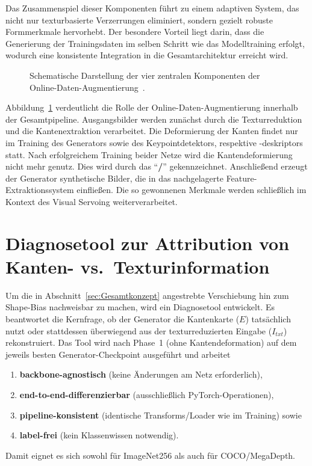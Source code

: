 Das Zusammenspiel dieser Komponenten führt zu einem adaptiven System, das nicht nur texturbasierte Verzerrungen eliminiert, sondern gezielt robuste Formmerkmale hervorhebt. Der besondere Vorteil liegt darin, dass die Generierung der Trainingsdaten im selben Schritt wie das Modelltraining erfolgt, wodurch eine konsistente Integration in die Gesamtarchitektur erreicht wird.

\begin{figure}[htpb]
    \centering
    
    \caption{Schematische Darstellung der vier zentralen Komponenten der Online-Daten-Augmentierung~\cite{He_2023_ICCV}.}
    \label{fig:PipelineGesamtkonzept}
\end{figure}
Abbildung~\ref{fig:PipelineGesamtkonzept} verdeutlicht die Rolle der Online-Daten-Augmentierung innerhalb der Gesamtpipeline. Ausgangsbilder werden zunächst durch die Texturreduktion und die Kantenextraktion verarbeitet. Die Deformierung der Kanten findet nur im Training des Generators sowie des Keypointdetektors, respektive -deskriptors statt. Nach erfolgreichem Training beider Netze wird die Kantendeformierung nicht mehr genutz. Dies wird durch das \enquote{\textbf{/}} gekennzeichnet. Anschließend erzeugt der Generator synthetische Bilder, die in das nachgelagerte Feature-Extraktionssystem einfließen. Die so gewonnenen Merkmale werden schließlich im Kontext des Visual Servoing weiterverarbeitet.




\section{Diagnosetool zur Attribution von Kanten- vs.\ Texturinformation}
\label{sec:DiagnoseTool}
Um die in Abschnitt~\ref{sec:Gesamtkonzept} angestrebte Verschiebung hin zum Shape-Bias nachweisbar zu machen, wird ein Diagnosetool entwickelt. Es beantwortet die Kernfrage, ob der Generator die Kantenkarte ($E$) tatsächlich nutzt oder stattdessen überwiegend aus der texturreduzierten Eingabe ($I_{txt}$) rekonstruiert.
Das Tool wird nach Phase~1 (ohne Kantendeformation) auf dem jeweils besten Generator-Checkpoint ausgeführt und arbeitet
\begin{enumerate}
    \item \textbf{backbone-agnostisch} (keine Änderungen am Netz erforderlich),
    \item \textbf{end-to-end-differenzierbar} (ausschließlich PyTorch-Operationen),
    \item \textbf{pipeline-konsistent} (identische Transforms/Loader wie im Training) sowie
    \item \textbf{label-frei} (kein Klassenwissen notwendig).
\end{enumerate}
Damit eignet es sich sowohl für ImageNet256 als auch für COCO/MegaDepth.

